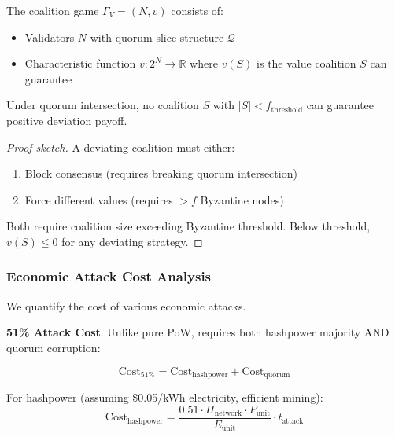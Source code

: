 \begin{definition}
The coalition game $\Gamma_V = (N, v)$ consists of:
\begin{itemize}
  \item Validators $N$ with quorum slice structure $\mathcal{Q}$
  \item Characteristic function $v: 2^N \to \mathbb{R}$ where $v(S)$ is the
    value coalition $S$ can guarantee
\end{itemize}
\end{definition}

\begin{theorem}
Under quorum intersection, no coalition $S$ with $|S| < f_{\text{threshold}}$
can guarantee positive deviation payoff.
\end{theorem}

\begin{proof}[Proof sketch]
A deviating coalition must either:
\begin{enumerate}
  \item Block consensus (requires breaking quorum intersection)
  \item Force different values (requires $> f$ Byzantine nodes)
\end{enumerate}
Both require coalition size exceeding Byzantine threshold. Below threshold,
$v(S) \leq 0$ for any deviating strategy.
\end{proof}

\subsubsection{Economic Attack Cost Analysis}

We quantify the cost of various economic attacks.

\textbf{51\% Attack Cost}.
Unlike pure PoW, \Botho requires both hashpower majority AND quorum corruption:

\begin{equation}
\text{Cost}_{51\%} = \text{Cost}_{\text{hashpower}} + \text{Cost}_{\text{quorum}}
\end{equation}

For hashpower (assuming \$0.05/kWh electricity, efficient mining):
\begin{equation}
\text{Cost}_{\text{hashpower}} = \frac{0.51 \cdot H_{\text{network}} \cdot P_{\text{unit}}}{E_{\text{unit}}} \cdot t_{\text{attack}}
\end{equation}

